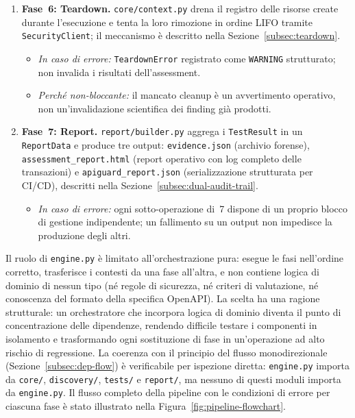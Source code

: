 \begin{enumerate}
      \item \textbf{Fase~6: Teardown.} \texttt{core/context.py} drena il registro
            delle risorse create durante l'esecuzione e tenta la loro rimozione in
            ordine \gls{LIFO} tramite \texttt{SecurityClient}; il meccanismo è
            descritto nella Sezione~\ref{subsec:teardown}.
            \begin{itemize}
                  \item \textit{In caso di errore:} \texttt{TeardownError} registrato come
                        \texttt{WARNING} strutturato; non invalida i risultati dell'assessment.
                  \item \textit{Perché non-bloccante:} il mancato cleanup è un avvertimento
                        operativo, non un'invalidazione scientifica dei finding già prodotti.
            \end{itemize}

      \item \textbf{Fase~7: Report.} \texttt{report/builder.py} aggrega i
            \texttt{TestResult} in un \texttt{ReportData} e produce tre output:
            \texttt{evidence.json} (archivio forense), \texttt{assessment\_report.html}
            (report operativo con log completo delle transazioni) e
            \texttt{apiguard\_report.json} (serializzazione strutturata per
            \gls{CI/CD}), descritti nella Sezione~\ref{subsec:dual-audit-trail}.
            \begin{itemize}
                  \item \textit{In caso di errore:} ogni sotto-operazione di~7 dispone di
                        un proprio blocco di gestione indipendente; un fallimento su un output
                        non impedisce la produzione degli altri.
            \end{itemize}
\end{enumerate}

Il ruolo di \texttt{engine.py} è limitato all'orchestrazione pura: esegue le fasi nell'ordine corretto, trasferisce i contesti da una fase all'altra, e non contiene logica di dominio di nessun tipo (né regole di sicurezza, né criteri di valutazione, né conoscenza del formato della specifica OpenAPI). La scelta ha una ragione strutturale: un orchestratore che incorpora logica di dominio diventa il punto di concentrazione delle dipendenze, rendendo difficile testare i componenti in isolamento e trasformando ogni sostituzione di fase in un'operazione ad alto rischio di regressione. La coerenza con il principio del flusso monodirezionale (Sezione~\ref{subsec:dep-flow}) è verificabile per ispezione diretta: \texttt{engine.py} importa da \texttt{core/}, \texttt{discovery/}, \texttt{tests/} e \texttt{report/}, ma nessuno di questi moduli importa da \texttt{engine.py}. Il flusso completo della pipeline con le condizioni di errore per ciascuna fase è stato illustrato nella Figura~\ref{fig:pipeline-flowchart}.


